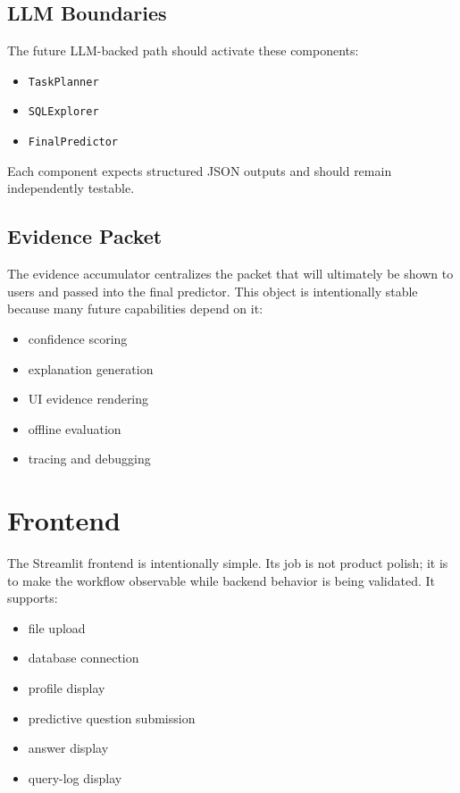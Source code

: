 \documentclass[11pt]{book}
\begin{document}
\section{LLM Boundaries}
The future LLM-backed path should activate these components:

\begin{itemize}
\item \texttt{TaskPlanner}
\item \texttt{SQLExplorer}
\item \texttt{FinalPredictor}
\end{itemize}

Each component expects structured JSON outputs and should remain independently testable.

\section{Evidence Packet}
The evidence accumulator centralizes the packet that will ultimately be shown to users and passed
into the final predictor. This object is intentionally stable because many future capabilities
depend on it:

\begin{itemize}
\item confidence scoring
\item explanation generation
\item UI evidence rendering
\item offline evaluation
\item tracing and debugging
\end{itemize}

\chapter{Frontend}
The Streamlit frontend is intentionally simple. Its job is not product polish; it is to make the
workflow observable while backend behavior is being validated. It supports:

\begin{itemize}
\item file upload
\item database connection
\item profile display
\item predictive question submission
\item answer display
\item query-log display
\end{itemize}
\end{document}
